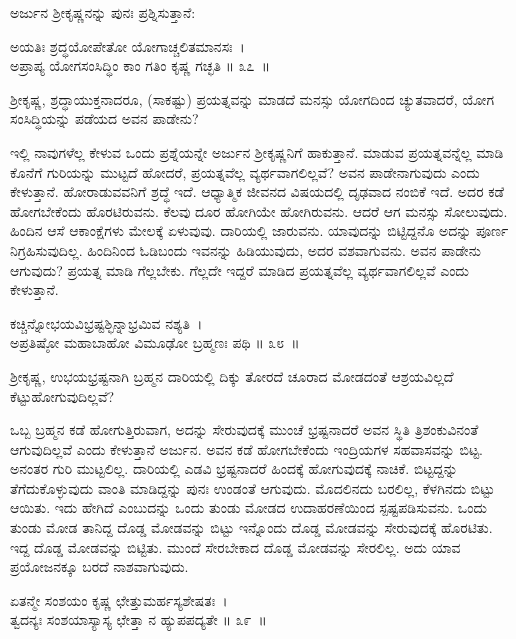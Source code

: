 ಅರ್ಜುನ ಶ‍್ರೀಕೃಷ್ಣನನ್ನು ಪುನಃ ಪ್ರಶ್ನಿಸುತ್ತಾನೆ:

\begin{shloka}
ಅಯತಿಃ ಶ್ರದ್ಧಯೋಪೇತೋ ಯೋಗಾಚ್ಚಲಿತಮಾನಸಃ~।\\ಅಪ್ರಾಪ್ಯ ಯೋಗಸಂಸಿದ್ಧಿಂ ಕಾಂ ಗತಿಂ ಕೃಷ್ಣ ಗಚ್ಛತಿ \hfill॥ ೩೭~॥
\end{shloka}

\newpage

\begin{artha}
ಶ‍್ರೀಕೃಷ್ಣ, ಶ್ರದ್ಧಾಯುಕ್ತನಾದರೂ, (ಸಾಕಷ್ಟು) ಪ್ರಯತ್ನವನ್ನು ಮಾಡದೆ ಮನಸ್ಸು ಯೋಗದಿಂದ ಚ್ಯುತವಾದರೆ, ಯೋಗ ಸಂಸಿದ್ಧಿಯನ್ನು ಪಡೆಯದ ಅವನ ಪಾಡೇನು?
\end{artha}

ಇಲ್ಲಿ ನಾವುಗಳೆಲ್ಲ ಕೇಳುವ ಒಂದು ಪ್ರಶ್ನೆಯನ್ನೇ ಅರ್ಜುನ ಶ‍್ರೀಕೃಷ್ಣನಿಗೆ ಹಾಕುತ್ತಾನೆ. ಮಾಡುವ ಪ್ರಯತ್ನವನ್ನೆಲ್ಲ ಮಾಡಿ ಕೊನೆಗೆ ಗುರಿಯನ್ನು ಮುಟ್ಟದೆ ಹೋದರೆ, ಪ್ರಯತ್ನವೆಲ್ಲ ವ್ಯರ್ಥವಾಗಲಿಲ್ಲವೆ? ಅವನ ಪಾಡೇನಾಗುವುದು ಎಂದು ಕೇಳುತ್ತಾನೆ. ಹೋರಾಡುವವನಿಗೆ ಶ್ರದ್ಧೆ ಇದೆ. ಆಧ್ಯಾತ್ಮಿಕ ಜೀವನದ ವಿಷಯದಲ್ಲಿ ದೃಢವಾದ ನಂಬಿಕೆ ಇದೆ. ಅದರ ಕಡೆ ಹೋಗಬೇಕೆಂದು ಹೊರಟಿರುವನು. ಕೆಲವು ದೂರ ಹೋಗಿಯೇ ಹೋಗಿರುವನು. ಆದರೆ ಆಗ ಮನಸ್ಸು ಸೋಲುವುದು. ಹಿಂದಿನ ಆಸೆ ಆಕಾಂಕ್ಷೆಗಳು ಮೇಲಕ್ಕೆ ಏಳುವುವು. ದಾರಿಯಲ್ಲಿ ಜಾರುವನು. ಯಾವು\-ದನ್ನು ಬಿಟ್ಟಿದ್ದನೊ ಅದನ್ನು ಪೂರ್ಣ ನಿಗ್ರಹಿಸುವುದಿಲ್ಲ. ಹಿಂದಿನಿಂದ ಓಡಿಬಂದು ಇವನನ್ನು ಹಿಡಿಯುವುದು, ಅದರ ವಶವಾಗುವನು. ಅವನ ಪಾಡೇನು ಆಗುವುದು? ಪ್ರಯತ್ನ ಮಾಡಿ ಗೆಲ್ಲಬೇಕು. ಗೆಲ್ಲದೇ ಇದ್ದರೆ ಮಾಡಿದ ಪ್ರಯತ್ನವೆಲ್ಲ ವ್ಯರ್ಥವಾಗಲಿಲ್ಲವೆ ಎಂದು ಕೇಳುತ್ತಾನೆ.

\begin{shloka}
ಕಚ್ಚಿನ್ನೋಭಯವಿಭ್ರಷ್ಟಶ್ಛಿನ್ನಾಭ್ರಮಿವ ನಶ್ಯತಿ~।\\ಅಪ್ರತಿಷ್ಠೋ ಮಹಾಬಾಹೋ ವಿಮೂಢೋ ಬ್ರಹ್ಮಣಃ ಪಥಿ \hfill॥ ೩೮~॥
\end{shloka}

\begin{artha}
ಶ‍್ರೀಕೃಷ್ಣ, ಉಭಯಭ್ರಷ್ಟನಾಗಿ ಬ್ರಹ್ಮನ ದಾರಿಯಲ್ಲಿ ದಿಕ್ಕು ತೋರದೆ ಚೂರಾದ ಮೋಡದಂತೆ ಆಶ್ರಯವಿಲ್ಲದೆ ಕೆಟ್ಟುಹೋಗುವುದಿಲ್ಲವೆ?
\end{artha}

ಒಬ್ಬ ಬ್ರಹ್ಮನ ಕಡೆ ಹೋಗುತ್ತಿರುವಾಗ, ಅದನ್ನು ಸೇರುವುದಕ್ಕೆ ಮುಂಚೆ ಭ್ರಷ್ಟನಾದರೆ ಅವನ ಸ್ಥಿತಿ ತ್ರಿಶಂಕುವಿನಂತೆ ಆಗುವುದಿಲ್ಲವೆ ಎಂದು ಕೇಳುತ್ತಾನೆ ಅರ್ಜುನ. ಅವನ ಕಡೆ ಹೋಗಬೇಕೆಂದು ಇಂದ್ರಿಯಗಳ ಸಹವಾಸವನ್ನು ಬಿಟ್ಟ. ಅನಂತರ ಗುರಿ ಮುಟ್ಟಲಿಲ್ಲ. ದಾರಿಯಲ್ಲಿ ಎಡವಿ ಭ್ರಷ್ಟನಾದರೆ ಹಿಂದಕ್ಕೆ ಹೋಗುವುದಕ್ಕೆ ನಾಚಿಕೆ. ಬಿಟ್ಟದ್ದನ್ನು ತೆಗೆದುಕೊಳ್ಳುವುದು ವಾಂತಿ ಮಾಡಿದ್ದನ್ನು ಪುನಃ ಉಂಡಂತೆ ಆಗುವುದು. ಮೊದಲಿನದು ಬರಲಿಲ್ಲ, ಕೆಳಗಿನದು ಬಿಟ್ಟು ಆಯಿತು. ಇದು ಹೇಗಿದೆ ಎಂಬುದನ್ನು ಒಂದು ತುಂಡು ಮೋಡದ ಉದಾಹರಣೆಯಿಂದ ಸ್ಪಷ್ಟಪಡಿಸುವನು. ಒಂದು ತುಂಡು ಮೋಡ ತಾನಿದ್ದ ದೊಡ್ಡ ಮೋಡವನ್ನು ಬಿಟ್ಟು ಇನ್ನೊಂದು ದೊಡ್ಡ ಮೋಡವನ್ನು ಸೇರುವುದಕ್ಕೆ ಹೊರಟಿತು. ಇದ್ದ ದೊಡ್ಡ ಮೋಡವನ್ನು ಬಿಟ್ಟಿತು. ಮುಂದೆ ಸೇರಬೇಕಾದ ದೊಡ್ಡ ಮೋಡವನ್ನು ಸೇರಲಿಲ್ಲ. ಅದು ಯಾವ ಪ್ರಯೋಜನಕ್ಕೂ ಬರದೆ ನಾಶವಾಗುವುದು.

\begin{shloka}
ಏತನ್ಮೇ ಸಂಶಯಂ ಕೃಷ್ಣ ಛೇತ್ತುಮರ್ಹಸ್ಯಶೇಷತಃ~।\\ತ್ವದನ್ಯಃ ಸಂಶಯಾಸ್ಯಾಸ್ಯ ಛೇತ್ತಾ ನ ಹ್ಯುಪಪದ್ಯತೇ \hfill॥ ೩೯~॥
\end{shloka}

